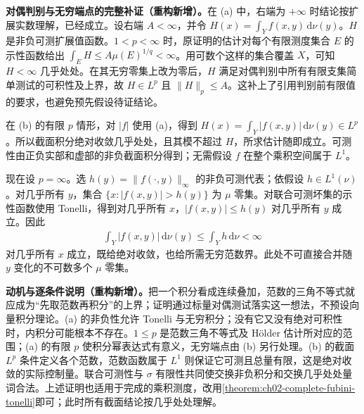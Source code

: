 \documentclass[../../main.tex]{subfiles}
\begin{document}
\begin{remark}
\textbf{对偶判别与无穷端点的完整补证（重构新增）。}在 (a) 中，右端为 $+\infty$ 时结论按扩展实数理解，已经成立。设右端 $A<\infty$，并令 $H(x)=\int_Y f(x,y)\,\mathrm d\nu(y)$。$H$ 是非负可测扩展值函数。$1<p<\infty$ 时，原证明的估计对每个有限测度集合 $E$ 的示性函数给出 $\int_EH\leqslant A\mu(E)^{1/q}<\infty$。用可数个这样的集合覆盖 $X$，可知 $H<\infty$ 几乎处处。在其无穷零集上改为零后，$H$ 满足对偶判别中所有有限支集简单测试的可积性及上界，故 $H\in L^p$ 且 $\|H\|_p\leqslant A$。这补上了引用判别前有限值的要求，也避免预先假设待证结论。

在 (b) 的有限 $p$ 情形，对 $|f|$ 使用 (a)，得到 $H(x)=\int_Y|f(x,y)|\,\mathrm d\nu(y)\in L^p$。所以截面积分绝对收敛几乎处处，且其模不超过 $H$，所求估计随即成立。可测性由正负实部和虚部的非负截面积分得到；无需假设 $f$ 在整个乘积空间属于 $L^1$。

现在设 $p=\infty$。选 $h(y)=\|f(\cdot,y)\|_\infty$ 的非负可测代表；依假设 $h\in L^1(\nu)$。对几乎所有 $y$，集合 $\{x:|f(x,y)|>h(y)\}$ 为 $\mu$ 零集。对联合可测坏集的示性函数使用 Tonelli，得到对几乎所有 $x$，$|f(x,y)|\leqslant h(y)$ 对几乎所有 $y$ 成立。因此
\begin{align*}
\int_Y|f(x,y)|\,\mathrm d\nu(y)\leqslant\int_Yh\,\mathrm d\nu<\infty
\end{align*}
对几乎所有 $x$ 成立，既给绝对收敛，也给所需无穷范数界。此处不可直接合并随 $y$ 变化的不可数多个 $\mu$ 零集。
\end{remark}
\begin{remark}
\textbf{动机与逐条件说明（重构新增）。}把一个积分看成连续叠加，范数的三角不等式就应成为“先取范数再积分”的上界；证明通过标量对偶测试落实这一想法，不预设向量积分理论。(a) 的非负性允许 Tonelli 与无穷积分；没有它又没有绝对可积性时，内积分可能根本不存在。$1\leqslant p$ 是范数三角不等式及 Hölder 估计所对应的范围；(a) 的有限 $p$ 使积分幂表达式有意义，无穷端点由 (b) 另行处理。(b) 的截面 $L^p$ 条件定义各个范数，范数函数属于 $L^1$ 则保证它可测且总量有限，这是绝对收敛的实际控制量。联合可测性与 $\sigma$ 有限性共同使交换非负积分和交换几乎处处量词合法。上述证明也适用于完成的乘积测度，改用\cref{theorem:ch02-complete-fubini-tonelli}即可；此时所有截面结论按几乎处处理解。
\end{remark}
\end{document}
